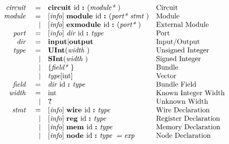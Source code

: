 \documentclass[12pt]{article}
\begin{document}
\[
\begin{array}{rrll}
\text{\em circuit\ }    &=     &\text{\bf circuit\ } \text{id } \text{\bf :\ } (\text{\em module*\ })                                        &\text{Circuit}\\
\text{\em module\ }     &=     &[\text{\em info}]\  \text{\bf module\ }  \text{id } \text{\bf :\ } (\text{\em port*\ } \text{\em stmt\ })                          &\text{Module}\\
                &\vert &[\text{\em info}]\  \text{\bf exmodule\ }  \text{id } \text{\bf :\ } (\text{\em port*\ })                                  &\text{External Module}\\
\text{\em port\ }       &=     &[\text{\em info}]\  \text{\em dir\ } \text{id } \text{\bf :\ } \text{\em type\ }                                           &\text{Port}\\
\text{\em dir\ }        &=     &\text{\bf input} \vert \text{\bf output}                                                &\text{Input/Output}\\
\text{\em type\ }       &=     &\text{\bf UInt}(\text{\em width\ })                                                        &\text{Unsigned Integer}\\
                &\vert &\text{\bf SInt}(\text{\em width\ })                                                        &\text{Signed Integer}\\
                &\vert &\{\text{\em field*\ }\}                                                         &\text{Bundle}\\
                &\vert &\text{\em type}[\text{int}]                                                             &\text{Vector}\\
\text{\em field\ }      &=     &\text{\em dir\ } \text{id } \text{\bf :\ } \text{\em type\ }                                                 &\text{Bundle Field}\\
\text{\em width\ }      &=     &\text{int}                                                                         &\text{Known Integer Width}\\
                &\vert &\text{\bf ?\ }                                                                        &\text{Unknown Width}\\
\text{\em stmt\ }       &=     &[\text{\em info}]\  \text{\bf wire\ } \text{id } \text{\bf :\ } \text{\em type\ }                                          &\text{Wire Declaration}\\
                &\vert &[\text{\em info}]\  \text{\bf reg\ } \text{id } \text{\bf :\ } \text{\em type\ }                                           &\text{Register Declaration}\\
                &\vert &[\text{\em info}]\  \text{\bf mem\ } \text{id } \text{\bf :\ } \text{\em type\ }                                           &\text{Memory Declaration}\\
                &\vert &[\text{\em info}]\  \text{\bf node\ } \text{id } \text{\bf :\ } \text{\em type\ } = \text{\em exp\ }                               &\text{Node Declaration}\\

\end{array}\]
\end{document}
